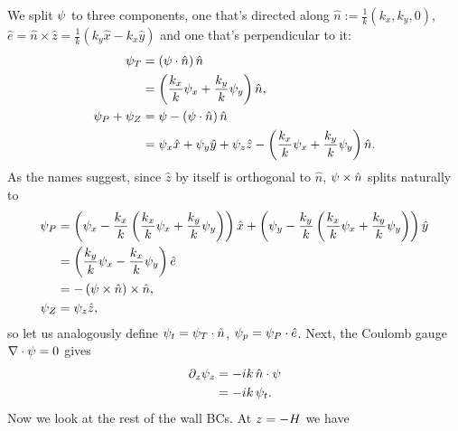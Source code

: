 \documentclass[reqno]{amsart}
\numberwithin{equation}{section}
\numberwithin{figure}{section}
\begin{document}
We split $\psi$ to three components, one that's directed along $\hat{n}:=\frac{1}{k}\left(k_{x},k_{y},0\right)$, $\hat{e}=\hat{n}\times\hat{z}=\frac{1}{k}\left(k_{y}\hat{x}-k_{x}\hat{y}\right)$ and one that's perpendicular to it:
\begin{align*}
\psi_{T}
  &= \left(\psi\cdot\hat{n}\right)\hat{n} \\
  &= \left(\frac{k_{x}}{k}\psi_{x}+\frac{k_{y}}{k}\psi_{y}\right)\hat{n}, \\
\psi_{P}+\psi_{Z}
  &= \psi-\left(\psi\cdot\hat{n}\right)\hat{n} \\
  &= \psi_{x}\hat{x}+\psi_{y}\hat{y}+\psi_{z}\hat{z}-\left(\frac{k_{x}}{k}\psi_{x}+\frac{k_{y}}{k}\psi_{y}\right)\hat{n}.
\end{align*}
As the names suggest, since $\hat{z}$ by itself is orthogonal to $\hat{n}$, $\psi\times\hat{n}$ splits naturally to
\begin{align*}
\psi_{P}
  &= \left(\psi_{x}-\frac{k_{x}}{k}\left(\frac{k_{x}}{k}\psi_{x}+\frac{k_{y}}{k}\psi_{y}\right)\right)\hat{x}+\left(\psi_{y}-\frac{k_{y}}{k}\left(\frac{k_{x}}{k}\psi_{x}+\frac{k_{y}}{k}\psi_{y}\right)\right)\hat{y} \\
  &= \left(\frac{k_{y}}{k}\psi_{x}-\frac{k_{x}}{k}\psi_{y}\right)\hat{e} \\
  &= -\left(\psi\times\hat{n}\right)\times\hat{n}, \\
\psi_{Z} &= \psi_{z}\hat{z},
\end{align*}
so let us analogously define $\psi_{t}=\psi_{T}\cdot\hat{n}$, $\psi_{p}=\psi_{P}\cdot\hat{e}$. Next, the Coulomb gauge $\nabla\cdot\psi=0$ gives
\begin{align*}
\partial_{z}\psi_{z}
  &= -ik\,\hat{n}\cdot\psi \\
  &= -ik\,\psi_{t}.
\end{align*}
Now we look at the rest of the wall BCs. At $z=-H$ we have
\end{document}
